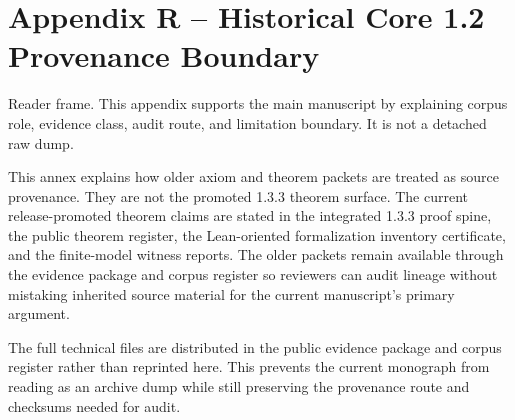 \section{Appendix R -- Historical Core 1.2 Provenance Boundary}
Reader frame. This appendix supports the main manuscript by explaining corpus role, evidence class, audit route, and limitation boundary. It is not a detached raw dump.

\label{app:historical-core-12-provenance-annex}

This annex explains how older axiom and theorem packets are treated as source
provenance. They are not the promoted 1.3.3 theorem surface. The current
release-promoted theorem claims are stated in the integrated 1.3.3 proof spine,
the public theorem register, the Lean-oriented formalization inventory certificate, and the finite-model
witness reports. The older packets remain available through the evidence
package and corpus register so reviewers can audit lineage without mistaking
inherited source material for the current manuscript's primary argument.

The full technical files are distributed in the public evidence package and corpus
register rather than reprinted here. This prevents the current monograph from
reading as an archive dump while still preserving the provenance route and
checksums needed for audit.
